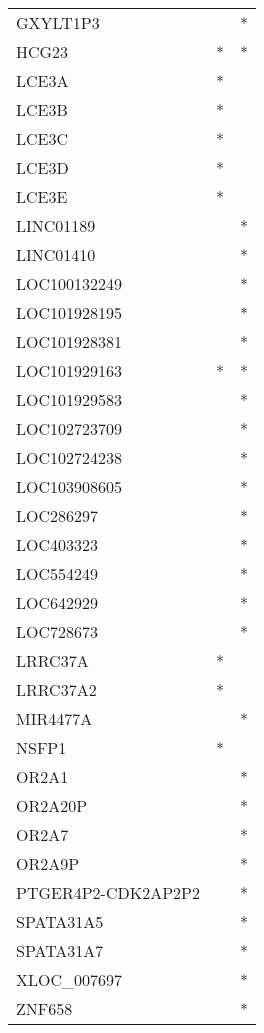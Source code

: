 \begin{longtable}{lcc}
GXYLT1P3           &                &          * \\
HCG23              &              * &          * \\
LCE3A              &              * &            \\
LCE3B              &              * &            \\
LCE3C              &              * &            \\
LCE3D              &              * &            \\
LCE3E              &              * &            \\
LINC01189          &                &          * \\
LINC01410          &                &          * \\
LOC100132249       &                &          * \\
LOC101928195       &                &          * \\
LOC101928381       &                &          * \\
LOC101929163       &              * &          * \\
LOC101929583       &                &          * \\
LOC102723709       &                &          * \\
LOC102724238       &                &          * \\
LOC103908605       &                &          * \\
LOC286297          &                &          * \\
LOC403323          &                &          * \\
LOC554249          &                &          * \\
LOC642929          &                &          * \\
LOC728673          &                &          * \\
LRRC37A            &              * &            \\
LRRC37A2           &              * &            \\
MIR4477A           &                &          * \\
NSFP1              &              * &            \\
OR2A1              &                &          * \\
OR2A20P            &                &          * \\
OR2A7              &                &          * \\
OR2A9P             &                &          * \\
PTGER4P2-CDK2AP2P2 &                &          * \\
SPATA31A5          &                &          * \\
SPATA31A7          &                &          * \\
XLOC\_007697        &                &          * \\
ZNF658             &                &          * \\
\end{longtable}
